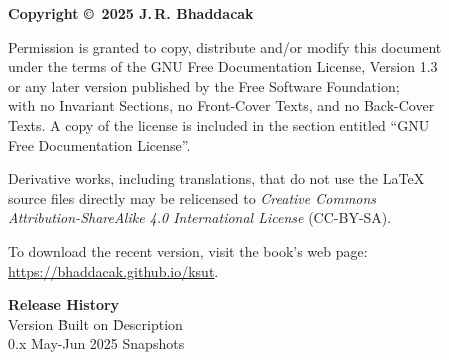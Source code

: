 \thispagestyle{empty}
{\footnotesize
\noindent\textbf{Copyright \copyright\ 2025 J.\,R. Bhaddacak}

\parskip=3mm
\noindent 
Permission is granted to copy, distribute and/or modify this document\\
under the terms of the GNU Free Documentation License, Version 1.3\\
or any later version published by the Free Software Foundation;\\
with no Invariant Sections, no Front-Cover Texts, and no Back-Cover\\
Texts.  A copy of the license is included in the section entitled ``GNU\\
Free Documentation License''.

\parskip=3mm
\noindent 
Derivative works, including translations, that do not use the \LaTeX\\
source files directly may be relicensed to \emph{Creative Commons\\
Attribution-ShareAlike 4.0 International License} (CC-BY-SA).

\parskip=3mm
\noindent 
To download the recent version, visit the book's web page:\\
\url{https://bhaddacak.github.io/ksut}.

\begin{tabbing}
\textbf{Release History}\\
Version \hspace{4mm} \= Built on \hspace{15mm} \= Description\\
0.x \>  May-Jun 2025 \> Snapshots \\
\end{tabbing}
}
